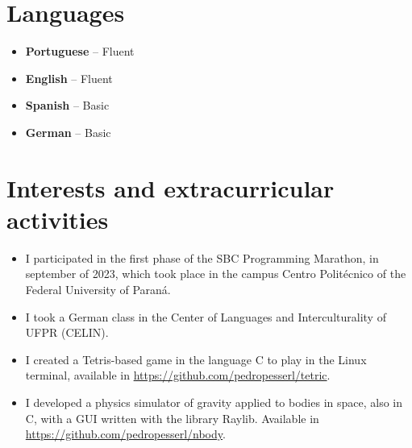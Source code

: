\documentclass[a4paper, 12pt]{moderncv}
\begin{document}
\section{Languages}
\vspace{4pt}
\begin{itemize}
    \item{\textbf{Portuguese} -- Fluent}
    \item{\textbf{English} -- Fluent}
    \item{\textbf{Spanish} -- Basic}
    \item{\textbf{German} -- Basic}
\end{itemize}
\vspace{4pt}

\section{Interests and extracurricular activities}
\vspace{4pt}
\begin{itemize}
    \item{I participated in the first phase of the SBC Programming Marathon, in
        september of 2023, which took place in the campus Centro Politécnico of
    the Federal University of Paraná.}
    \vspace{4pt}
    \item{I took a German class in the Center of Languages and Interculturality of
        UFPR (CELIN).}
    \vspace{4pt}
    \item{I created a Tetris-based game in the language C to play in the Linux
        terminal, available in \url{https://github.com/pedropesserl/tetric}.}
    \vspace{4pt}
    \item{I developed a physics simulator of gravity applied to bodies in
        space, also in C, with a GUI written with the library Raylib. Available
    in \url{https://github.com/pedropesserl/nbody}.}
\end{itemize}
\end{document}
